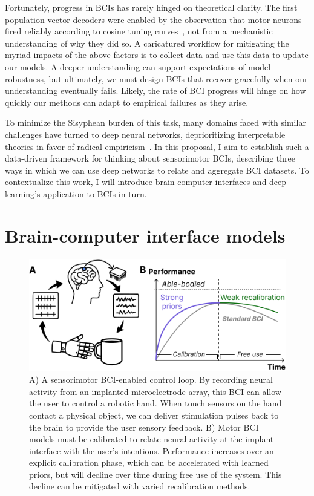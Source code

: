 \documentclass[12pt,oneside]{report}
\begin{document}
Fortunately, progress in BCIs has rarely hinged on theoretical clarity. The first population vector decoders were enabled by the observation that motor neurons fired reliably according to cosine tuning curves~\citep{Georgopoulos1986}, not from a mechanistic understanding of why they did so. A caricatured workflow for mitigating the myriad impacts of the above factors is to collect data and use this data to update our models. A deeper understanding can support expectations of model robustness, but ultimately, we must design BCIs that recover gracefully when our understanding eventually fails. Likely, the rate of BCI progress will hinge on how quickly our methods can adapt to empirical failures as they arise.

To minimize the Sisyphean burden of this task, many domains faced with similar challenges have turned to deep neural networks, deprioritizing interpretable theories in favor of radical empiricism~\citep{wang2023scientific}. In this proposal, I aim to establish such a data-driven framework for thinking about sensorimotor BCIs, describing three ways in which we can use deep networks to relate and aggregate BCI datasets. To contextualize this work, I will introduce brain computer interfaces and deep learning’s application to BCIs in turn.

\section{Brain-computer interface models}
\label{sec:bci_models}

\begin{figure}[h]
  \centering
  \includegraphics[width=0.95\linewidth]{ch1_loop_and_lifecycle.png}
  \caption{A) A sensorimotor BCI-enabled control loop. By recording neural activity from an implanted microelectrode array, this BCI can allow the user to control a robotic hand. When touch sensors on the hand contact a physical object, we can deliver stimulation pulses back to the brain to provide the user sensory feedback. B) Motor BCI models must be calibrated to relate neural activity at the implant interface with the user's intentions. Performance increases over an explicit calibration phase, which can be accelerated with learned priors, but will decline over time during free use of the system. This decline can be mitigated with varied recalibration methods.}
  \label{fig:bci_overview}
\end{figure}
\end{document}
